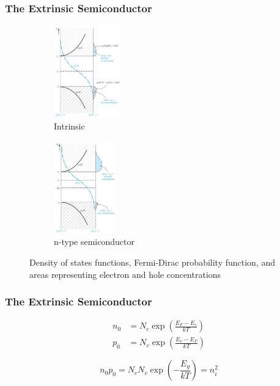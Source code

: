 \documentclass{beamer}
\begin{document}
    \begin{frame} \frametitle{The Extrinsic Semiconductor}
        \begin{figure}[H]
            \centering
            \begin{subfigure}[b]{0.45\linewidth}
                \centering
                \includegraphics[height=4cm]{Intrinsic.jpg}
                \caption{Intrinsic}
                \label{subfig:Intrinsic.jpg}
            \end{subfigure}
            \begin{subfigure}[b]{0.45\linewidth}
                \centering
                \includegraphics[height=4cm]{Extrinsic-p-type.jpg}
                \caption{n-type semiconductor}
                \label{subfig:Extrinsic-n-type.jpg}
            \end{subfigure}
            \caption{Density of states functions, Fermi-Dirac probability function, and areas representing electron and hole concentrations}
            \label{fig:subcaption-of-dopants}
        \end{figure}
    \end{frame}

    \begin{frame} \frametitle{The Extrinsic Semiconductor}
        \begin{equation*}
            \begin{aligned}
                n_0 &= N_c \exp\left( \frac{E_F - E_c}{kT}  \right) \\
                p_0 &= N_v \exp \left( \frac{E_v - E_F}{kT}  \right)
            \end{aligned}
        \end{equation*}

        \begin{equation*}
            \boxed{n_0p_0 = N_c N_v \exp \left( -\frac{E_g}{kT}  \right) = n_i^2}
        \end{equation*}
    \end{frame}
\end{document}
